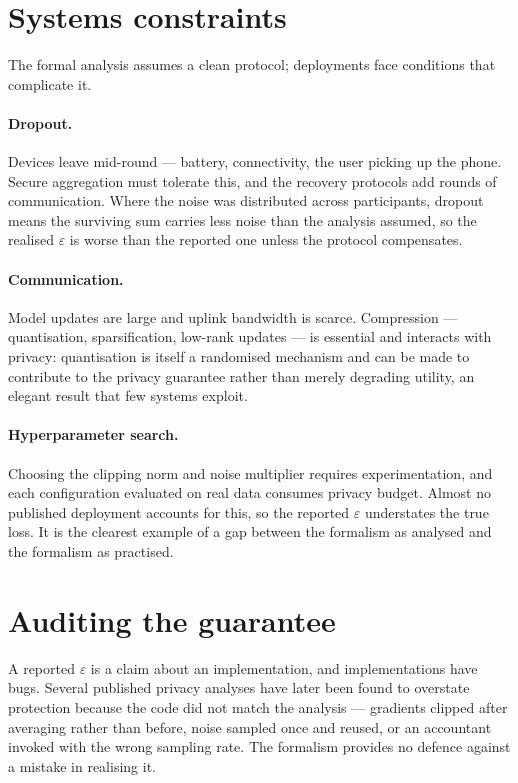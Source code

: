 \documentclass[11pt,a4paper]{article}
\begin{document}
\section{Systems constraints}
\label{sec:systems}

The formal analysis assumes a clean protocol; deployments face conditions that
complicate it.

\paragraph{Dropout.}
Devices leave mid-round --- battery, connectivity, the user picking up the
phone. Secure aggregation must tolerate this, and the recovery protocols add
rounds of communication. Where the noise was distributed across participants,
dropout means the surviving sum carries less noise than the analysis assumed,
so the realised $\varepsilon$ is worse than the reported one unless the
protocol compensates.

\paragraph{Communication.}
Model updates are large and uplink bandwidth is scarce. Compression --- 
quantisation, sparsification, low-rank updates --- is essential and interacts
with privacy: quantisation is itself a randomised mechanism and can be made to
contribute to the privacy guarantee rather than merely degrading utility, an
elegant result that few systems exploit.

\paragraph{Hyperparameter search.}
Choosing the clipping norm and noise multiplier requires experimentation, and
each configuration evaluated on real data consumes privacy budget. Almost no
published deployment accounts for this, so the reported $\varepsilon$
understates the true loss. It is the clearest example of a gap between the
formalism as analysed and the formalism as practised.

\section{Auditing the guarantee}
\label{sec:auditing}

A reported $\varepsilon$ is a claim about an implementation, and
implementations have bugs. Several published privacy analyses have later been
found to overstate protection because the code did not match the analysis ---
gradients clipped after averaging rather than before, noise sampled once and
reused, or an accountant invoked with the wrong sampling rate. The formalism
provides no defence against a mistake in realising it.
\end{document}
